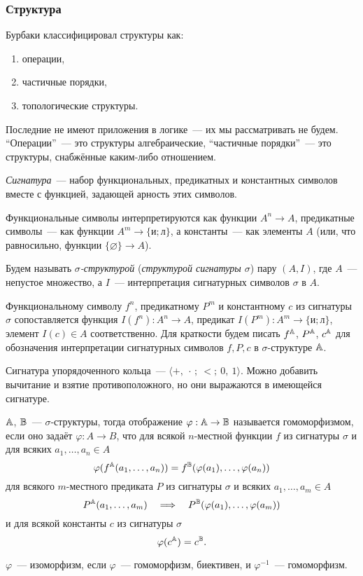 \subsubsection{Структура}

Бурбаки классифицировал структуры как:
\begin{enumerate}[itemsep=-1.4mm]
	\item операции,
	\item частичные порядки,
	\item топологические структуры.
\end{enumerate}

Последние не имеют приложения в логике~— их мы рассматривать не будем. “Операции”~— это структуры алгебраические, “частичные порядки”~— это структуры, снабжённые каким-либо отношением.

\begin{definition}
	\emph{Сигнатура}~— набор функциональных, предикатных и константных символов вместе с функцией, задающей арность этих символов.

	Функциональные символы интерпретируются как функции $A^n \to A$, предикатные символы~— как функции $A^m \to \{\text{и}; \text{л}\}$, а константы~— как элементы $A$ (или, что равносильно, функции $\{\varnothing\} \to A$).

	Будем называть \emph{$\sigma$-структурой} (\emph{структурой сигнатуры $\sigma$}) пару $(A, I)$, где $A$~— непустое множество, а $I$~— интерпретация сигнатурных символов $\sigma$ в $A$.
\end{definition}

\begin{remark}
	Функциональному символу $f^n$, предикатному $P^m$ и константному $c$ из сигнатуры $\sigma$ сопоставляется функция $I(f^n): A^n \to A$, предикат $I(P^m): A^m \to \{\text{и}; \text{л}\}$, элемент $I(c) \in A$ соответственно. 
	Для краткости будем писать $f^{\mathbb A}$, $P^{\mathbb A}$, $c^{\mathbb A}$ для обозначения интерпретации сигнатурных символов $f,P,c$ в $\sigma$-структуре ${\mathbb A}$. 
\end{remark}

\begin{exmpl}
	Сигнатура упорядоченного кольца~— $\langle {+},\ {\cdot}\,;\ {<};\ 0,\ 1 \rangle$. Можно добавить вычитание и взятие противоположного, но они выражаются в имеющейся сигнатуре.
\end{exmpl}

\begin{definition}
	${\mathbb A}$, ${\mathbb B}$~— $\sigma$-структуры, тогда отображение $\varphi: {\mathbb A} \to {\mathbb B}$ называется гомоморфизмом, если оно задаёт $\varphi: A \to B$, что для всякой $n$-местной функции $f$ из сигнатуры $\sigma$ и для всяких $a_1, \dots, a_n \in A$
	\[\varphi(f^{\mathbb A}(a_1, \dots, a_n)) = f^{\mathbb B}(\varphi(a_1), \dots, \varphi(a_n))\]
	для всякого $m$-местного предиката $P$ из сигнатуры $\sigma$ и всяких $a_1, \dots, a_m \in A$
	\[P^{\mathbb A}(a_1, \dots, a_m) \quad \Longrightarrow \quad P^{\mathbb B}(\varphi(a_1), \dots, \varphi(a_m))\]
	и для всякой константы $c$ из сигнатуры $\sigma$
	\[\varphi(c^{\mathbb A}) = c^{\mathbb B}.\]

	$\varphi$~— изоморфизм, если $\varphi$~— гомоморфизм, биективен, и $\varphi^{-1}$~— гомоморфизм.
\end{definition}


